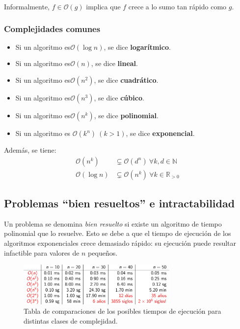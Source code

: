 \documentclass[a4paper]{report}
\newcommand{\BigO}[1]{\ensuremath{\mathcal{O}(#1)}}
\newcommand{\N}{\mathbb{N}}
\newcommand{\R}{\mathbb{R}}
\begin{document}
Informalmente, $f \in \BigO{g}$ implica que $f$ crece a lo sumo tan rápido como $g$.

\subsubsection{Complejidades comunes}

\begin{itemize}
    \item Si un algoritmo es\BigO{\log{n}}, se dice \textbf{logarítmico}.
    \item Si un algoritmo es\BigO{n}, se dice \textbf{lineal}.
    \item Si un algoritmo es\BigO{n^2}, se dice \textbf{cuadrático}.
    \item Si un algoritmo es\BigO{n^3}, se dice \textbf{cúbico}.
    \item Si un algoritmo es\BigO{n^k}, se dice \textbf{polinomial}.
    \item Si un algoritmo es $\BigO{k^n}\ (k > 1)$, se dice \textbf{exponencial}.
\end{itemize}

Además, se tiene:
\begin{align*}
    \BigO{n^k}     & \subsetneq \BigO{d^n}\ \forall k, d \in \N   \\
    \BigO{\log{n}} & \subsetneq \BigO{n^k}\ \forall k \in \R_{>0}
\end{align*}

\subsection{Problemas ``bien resueltos'' e intractabilidad}

Un problema se denomina \textit{bien resuelto} si existe un algoritmo de tiempo polinomial que lo resuelve. Esto se debe a que el tiempo de ejecución de los algoritmos exponenciales crece demasiado rápido: su ejecución puede resultar infactible para valores de $n$ pequeños.

\begin{figure}[H]
    \centering
    \includegraphics[width=0.7\textwidth]{tabla_complejidades.png}
    \caption*{Tabla de comparaciones de los posibles tiempos de ejecución para distintas clases de complejidad.}
\end{figure}
\end{document}

